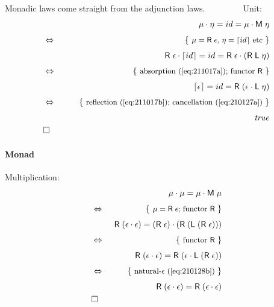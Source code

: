 \documentclass{elsarticle}
\newcommand{\Varid}[1]{\mathit{#1}}
\def\comp{ \mathbin{\cdot} }
\def\fun#1{\mathsf{#1}}
\def\just#1#2{\\ &#1& \rule{2em}{0pt} \{ \mbox{\rule[-.7em]{0pt}{1.8em} \small #2 \/} \} \nonumber\\ && }
\def\qed{\\&\Box&\nonumber}
\def\start{&&}
\def\equiv{\Leftrightarrow}
\begin{document}
Monadic laws come straight from the adjunction laws.
~~~~~~ ~ Unit:
\begin{eqnarray*}
\start
	\ensuremath{\mu \comp \eta \mathrel{=}{id}\mathrel{=}\mu \comp \fun M \;\eta }
%
\just\equiv{\ensuremath{\mu\mathrel{=}\fun R \;\epsilon }, \ensuremath{\eta \mathrel{=}\lceil {id}\rceil} etc}
%
	\ensuremath{\fun R \;\epsilon  \comp \lceil {id}\rceil\mathrel{=}{id}\mathrel{=}\fun R \;\epsilon  \comp (\fun R \;\fun L \;\eta )}
%
\just\equiv{absorption (\ref{eq:211017a}); functor \ensuremath{\fun R }  }
%
	\ensuremath{\lceil \epsilon \rceil\mathrel{=}{id}\mathrel{=}\fun R \;(\epsilon  \comp \fun L \;\eta )}
%
\just\equiv{ reflection (\ref{eq:211017b}); cancellation (\ref{eq:210127a}) }
%
	\ensuremath{\Varid{true}}
\qed
\end{eqnarray*}
%
%

\paragraph{Monad}
Multiplication:
\begin{eqnarray*}
\start
	\ensuremath{\mu \comp \mu\mathrel{=}\mu \comp \fun M \;\mu}
%
\just\equiv{\ensuremath{\mu\mathrel{=}\fun R \;\epsilon }; functor \ensuremath{\fun R } }
%
	\ensuremath{\fun R \;(\epsilon  \comp \epsilon )\mathrel{=}(\fun R \;\epsilon ) \comp (\fun R \;(\fun L \;(\fun R \;\epsilon )))}
%
\just\equiv{functor \ensuremath{\fun R } }
%
	\ensuremath{\fun R \;(\epsilon  \comp \epsilon )\mathrel{=}\fun R \;(\epsilon  \comp \fun L \;(\fun R \;\epsilon ))}
%
\just\equiv{ natural-\ensuremath{\epsilon } (\ref{eq:210128b}) }
%
	\ensuremath{\fun R \;(\epsilon  \comp \epsilon )\mathrel{=}\fun R \;(\epsilon  \comp \epsilon )}
\qed
\end{eqnarray*}
%
\end{document}
